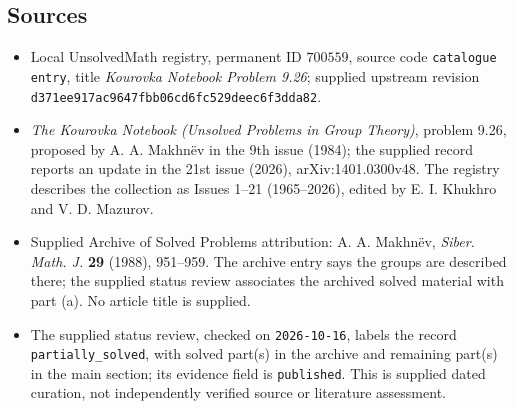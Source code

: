\documentclass[11pt]{article}
\begin{document}
\subsection{Sources}
\begin{itemize}
\item Local UnsolvedMath registry, permanent ID \(700559\), source code \texttt{catalogue entry}, title \emph{Kourovka Notebook Problem 9.26}; supplied upstream revision \texttt{d371ee917ac9647fbb06cd6fc529deec6f3dda82}.
\item \emph{The Kourovka Notebook (Unsolved Problems in Group Theory)}, problem 9.26, proposed by A. A. Makhn\"ev in the 9th issue (1984); the supplied record reports an update in the 21st issue (2026), arXiv:1401.0300v48. The registry describes the collection as Issues 1--21 (1965--2026), edited by E. I. Khukhro and V. D. Mazurov.
\item Supplied Archive of Solved Problems attribution: A. A. Makhn\"ev, \emph{Siber. Math. J.} \textbf{29} (1988), 951--959. The archive entry says the groups are described there; the supplied status review associates the archived solved material with part (a). No article title is supplied.
\item The supplied status review, checked on \texttt{2026-10-16}, labels the record \texttt{partially\_solved}, with solved part(s) in the archive and remaining part(s) in the main section; its evidence field is \texttt{published}. This is supplied dated curation, not independently verified source or literature assessment.
\end{itemize}
\end{document}
